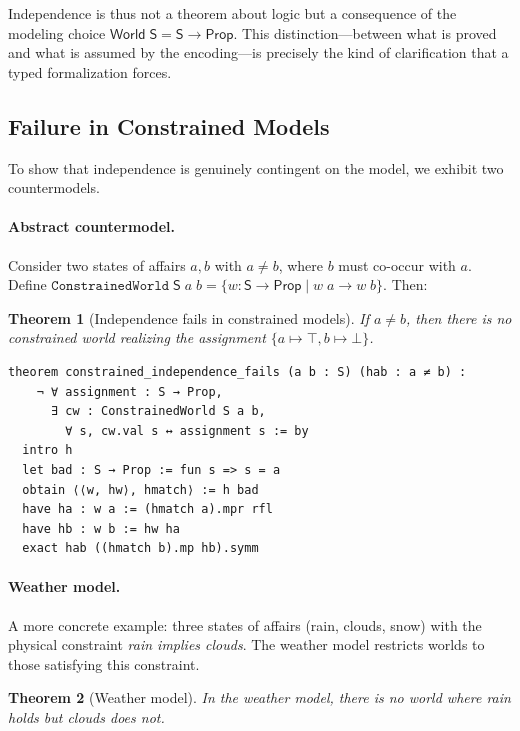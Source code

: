 \documentclass[10pt, letterpaper]{article}
\newtheorem{theorem}{Theorem}[section]
\theoremstyle{definition}
\theoremstyle{remark}
\newcommand{\Sach}{\mathsf{S}}
\newcommand{\World}{\mathsf{World}}
\newcommand{\Prop}{\mathsf{Prop}}
\begin{document}
\noindent
Independence is thus not a theorem about logic but a consequence
of the modeling choice $\World\;\Sach = \Sach \to \Prop$.
This distinction---between what is proved and what is assumed by
the encoding---is precisely the kind of clarification that a
typed formalization forces.

\subsection{Failure in Constrained Models}
\label{sec:constrained}

To show that independence is genuinely contingent on the model,
we exhibit two countermodels.

\paragraph{Abstract countermodel.}
Consider two states of affairs $a, b$ with $a \neq b$, where
$b$ must co-occur with $a$.  Define
$\mathtt{ConstrainedWorld}\;\Sach\;a\;b = \{w : \Sach \to \Prop
\mid w\;a \to w\;b\}$.  Then:

\begin{theorem}[Independence fails in constrained models]
\label{thm:constrained}
If $a \neq b$, then there is no constrained world realizing the
assignment $\{a \mapsto \top, b \mapsto \bot\}$.
\end{theorem}

\begin{lstlisting}
theorem constrained_independence_fails (a b : S) (hab : a ≠ b) :
    ¬ ∀ assignment : S → Prop,
      ∃ cw : ConstrainedWorld S a b,
        ∀ s, cw.val s ↔ assignment s := by
  intro h
  let bad : S → Prop := fun s => s = a
  obtain ⟨⟨w, hw⟩, hmatch⟩ := h bad
  have ha : w a := (hmatch a).mpr rfl
  have hb : w b := hw ha
  exact hab ((hmatch b).mp hb).symm
\end{lstlisting}

\paragraph{Weather model.}
A more concrete example: three states of affairs (rain, clouds,
snow) with the physical constraint \emph{rain implies clouds}.
The weather model restricts worlds to those satisfying this
constraint.

\begin{theorem}[Weather model]
\label{thm:weather}
In the weather model, there is no world where rain holds but
clouds does not.
\end{theorem}
\end{document}
